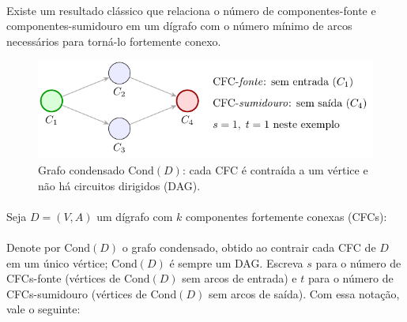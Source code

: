 \documentclass[12pt,a4paper]{article}
\def\emph#1{#1}%
\begin{document}
\paragraph{}
Existe um resultado clássico que relaciona o número de componentes-fonte e componentes-sumidouro em um dígrafo com o número mínimo de arcos necessários para torná-lo fortemente conexo.


\begin{figure}[H]
    \centering
    \includegraphics[width=0.9\linewidth]{figures/fig_condensado_st.pdf}

    \caption{Grafo condensado $\mathrm{Cond}(D)$: cada CFC é contraída a um vértice e não há circuitos dirigidos (DAG).}
    \label{fig:condensado-st}
\end{figure}


\paragraph{}
Seja $D=(V,A)$ um dígrafo com $k$ componentes fortemente conexas (CFCs):

\paragraph{}
Denote por $\mathrm{Cond}(D)$ o grafo \emph{condensado}, obtido ao contrair cada CFC de $D$ em um único vértice; $\mathrm{Cond}(D)$ é sempre um DAG. Escreva $s$ para o número de CFCs-\emph{fonte} (vértices de $\mathrm{Cond}(D)$ sem arcos de \emph{entrada}) e $t$ para o número de CFCs-\emph{sumidouro} (vértices de $\mathrm{Cond}(D)$ sem arcos de \emph{saída}). Com essa notação, vale o seguinte:
\end{document}
